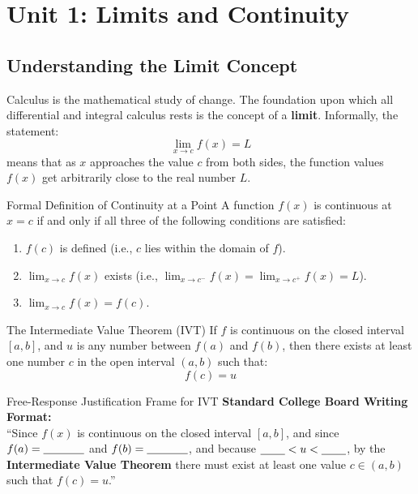 ﻿\documentclass[11pt,oneside,openany]{book}
\begin{document}
\chapter{Unit 1: Limits and Continuity}
\section{Understanding the Limit Concept}
Calculus is the mathematical study of change. The foundation upon which all differential and integral calculus rests is the concept of a \textbf{limit}. Informally, the statement:
\[
\lim_{x \to c} f(x) = L
\]
means that as $x$ approaches the value $c$ from both sides, the function values $f(x)$ get arbitrarily close to the real number $L$.

\begin{theorembox}{Formal Definition of Continuity at a Point}
A function $f(x)$ is continuous at $x = c$ if and only if all three of the following conditions are satisfied:
\begin{enumerate}[leftmargin=1.5em]
  \item $f(c)$ is defined (i.e., $c$ lies within the domain of $f$).
  \item $\lim_{x \to c} f(x)$ exists (i.e., $\lim_{x \to c^-} f(x) = \lim_{x \to c^+} f(x) = L$).
  \item $\lim_{x \to c} f(x) = f(c)$.
\end{enumerate}
\end{theorembox}

\begin{theorembox}{The Intermediate Value Theorem (IVT)}
If $f$ is continuous on the closed interval $[a, b]$, and $u$ is any number between $f(a)$ and $f(b)$, then there exists at least one number $c$ in the open interval $(a, b)$ such that:
\[
f(c) = u
\]
\end{theorembox}

\begin{frqbox}{Free-Response Justification Frame for IVT}
\textbf{Standard College Board Writing Format:}\\
``Since $f(x)$ is continuous on the closed interval $[a, b]$, and since $f(a) = \underline{\hspace{0.5in}}$ and $f(b) = \underline{\hspace{0.5in}}$, and because $\underline{\hspace{0.3in}} < u < \underline{\hspace{0.3in}}$, by the \textbf{Intermediate Value Theorem} there must exist at least one value $c \in (a, b)$ such that $f(c) = u$.''
\end{frqbox}
\end{document}
